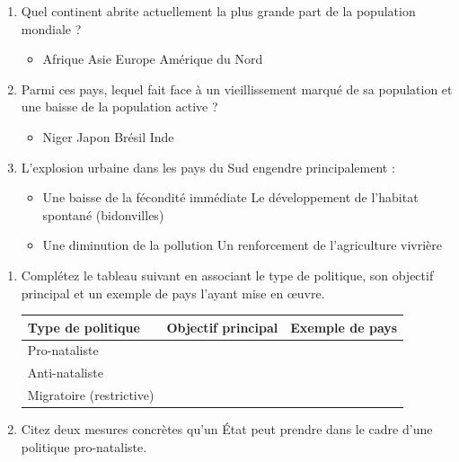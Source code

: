 \documentclass[11pt]{article}
\begin{document}
\begin{exercice}
\begin{enumerate}
    \item Quel continent abrite actuellement la plus grande part de la population mondiale ?
    \begin{itemize}
        \item[A.] Afrique \quad [B.] Asie \quad [C.] Europe \quad [D.] Amérique du Nord
    \end{itemize}
    \item Parmi ces pays, lequel fait face à un vieillissement marqué de sa population et une baisse de la population active ?
    \begin{itemize}
        \item[A.] Niger \quad [B.] Japon \quad [C.] Brésil \quad [D.] Inde
    \end{itemize}
    \item L'explosion urbaine dans les pays du Sud engendre principalement :
    \begin{itemize}
        \item[A.] Une baisse de la fécondité immédiate \quad [B.] Le développement de l'habitat spontané (bidonvilles)
        \item[C.] Une diminution de la pollution \quad [D.] Un renforcement de l'agriculture vivrière
    \end{itemize}
\end{enumerate}
\end{exercice}

\begin{exercice}
\begin{enumerate}
    \item Complétez le tableau suivant en associant le type de politique, son objectif principal et un exemple de pays l'ayant mise en œuvre.
    \begin{tabular}{|p{3.5cm}|p{5cm}|p{4cm}|}
    \hline
    \textbf{Type de politique} & \textbf{Objectif principal} & \textbf{Exemple de pays} \\ \hline
    Pro-nataliste & & \\ \hline
    Anti-nataliste & & \\ \hline
    Migratoire (restrictive) & & \\ \hline
    \end{tabular}
    \item Citez deux mesures concrètes qu'un État peut prendre dans le cadre d'une politique pro-nataliste.
\end{enumerate}
\end{exercice}
\end{document}
